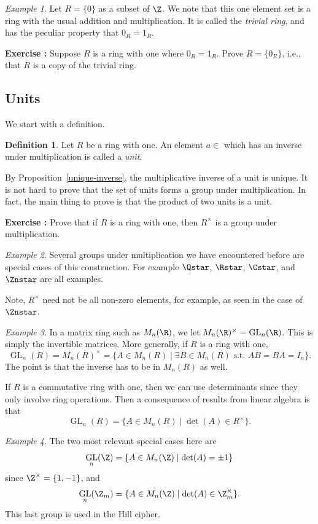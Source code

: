 \documentclass[12pt]{amsart}
\DeclareMathOperator{\GL}{GL}
\newcounter{probs}
\newenvironment{prob}{%
  \refstepcounter{probs}
  \par\medskip\noindent\textbf{Exercise \theprobs:} }{\par\medskip}
\theoremstyle{plain}
\theoremstyle{definition}
\newtheorem{defn}[thm]{Definition}
\theoremstyle{remark}
\newtheorem*{exam}{Example}
\begin{document}
\begin{exam}
  Let $R=\{0\}$ as a subset of $\Z$.  We note that this one element
  set is a ring with the usual addition and multiplication.  It is
  called the \emph{trivial ring}, and has the peculiar property that
  $0_R=1_R$.
\end{exam}
\begin{prob} \label{triv-ring-crit}
  Suppose $R$ is a ring with one where $0_R=1_R$.  Prove $R=\{0_R\}$,
  i.e., that $R$ is a copy of the trivial ring.
\end{prob}

\subsection{Units}
We start with a definition.
\begin{defn}
Let $R$ be a ring with one.  An element $a\in $ which has an inverse under
multiplication is called a \emph{unit}.  
\end{defn}
By Proposition~\ref{unique-inverse}, the multiplicative inverse of a unit
is unique.  It is not hard to prove that the set of units forms a
group under multiplication.  In fact, the main thing to prove is that
the product of two units is a unit.
\begin{prob}
  Prove that if $R$ is a ring with one, then $R^\times$ is a group
  under multiplication.
\end{prob}
\begin{exam}
  Several groups under multiplication we have encountered before are
  special cases of this construction.  For example $\Qstar$, $\Rstar$,
  $\Cstar$, and $\Znstar$ are all examples.  
\end{exam}
Note, $R^\times$ need not be all non-zero elements, for example, as
seen in the case of $\Znstar$.
\begin{exam}
  In a matrix ring such as $M_n(\R)$, we let $M_n(\R)^\times =
  \GL_n(\R)$.  This is simply the invertible matrices.  More
  generally, if $R$ is a ring with one,
  \[ \GL_n(R)= M_n(R)^\times = \{A\in M_n(R) \mid \exists B\in M_n(R)
  \text{ s.t. } AB=BA=I_n\}.\]
  The point is that the inverse has to be in $M_n(R)$ as well.
\end{exam}

If $R$ is a commutative ring with one, then we can use determinants
since they only involve ring operations.  Then a consequence of
results from linear algebra is that
\[ \GL_n(R) = \{A\in M_n(R)\mid \det(A)\in R^\times\}.\]
\begin{exam}
  The two most relevant special cases here are
  \[ \GL_n(\Z) = \{A\in M_n(\Z)\mid \det(A)=\pm 1\}\]
  since $\Z^\times = \{1,-1\}$, and
  \[ \GL_n(\Z_m) = \{A\in M_n(\Z)\mid \det(A)\in \Z_m^\times\}.\]
  This last group is used in the Hill cipher.
\end{exam}
\end{document}
